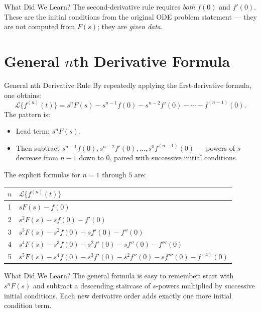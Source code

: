 \documentclass[12pt,a4paper]{article}
\begin{document}
\begin{learnbox}{What Did We Learn?}
The second-derivative rule requires \emph{both} \(f(0)\) and \(f'(0)\).
These are the initial conditions from the original ODE problem statement ---
they are not computed from \(F(s)\); they are \emph{given data}.
\end{learnbox}

\section{General \texorpdfstring{$n$}{n}th Derivative Formula}

\begin{infobox}{General nth Derivative Rule}
By repeatedly applying the first-derivative formula, one obtains:
\[
  \mathcal{L}\{f^{(n)}(t)\}
  = s^n F(s) - s^{n-1}f(0) - s^{n-2}f'(0) - \cdots - f^{(n-1)}(0).
\]
The pattern is:
\begin{itemize}
  \item Lead term: \(s^n F(s)\).
  \item Then subtract \(s^{n-1}f(0), s^{n-2}f'(0), \ldots, s^0 f^{(n-1)}(0)\) --- powers of \(s\) decrease from \(n-1\) down to \(0\), paired with successive initial conditions.
\end{itemize}

\medskip
The explicit formulas for \(n = 1\) through \(5\) are:

\begin{center}
\begin{tabular}{c l}
\toprule
\(n\) & \(\mathcal{L}\{f^{(n)}(t)\}\) \\
\midrule
1 & \(sF(s) - f(0)\) \\
2 & \(s^2F(s) - sf(0) - f'(0)\) \\
3 & \(s^3F(s) - s^2f(0) - sf'(0) - f''(0)\) \\
4 & \(s^4F(s) - s^3f(0) - s^2f'(0) - sf''(0) - f'''(0)\) \\
5 & \(s^5F(s) - s^4f(0) - s^3f'(0) - s^2f''(0) - sf'''(0) - f^{(4)}(0)\) \\
\bottomrule
\end{tabular}
\end{center}
\end{infobox}

\begin{learnbox}{What Did We Learn?}
The general formula is easy to remember: start with \(s^n F(s)\) and subtract
a descending staircase of \(s\)-powers multiplied by successive initial conditions.
Each new derivative order adds exactly one more initial condition term.
\end{learnbox}
\end{document}
